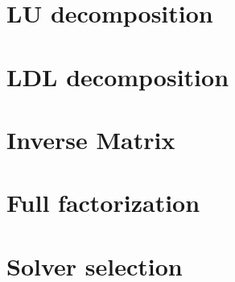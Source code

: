 \documentclass[fontsize = 10pt,DIV = 13]{scrartcl}
\begin{document}
\begin{comment}


\subsection{Notation}

This document uses bold symbols for matrices and vectors.
Bold capital letters like $\mathbf{A}$ are used for matrices.
Lower case bold letters are used for vectors ($\mathbf{r}$, $\mathbf{x}$).
The individual elements of a vector are given by:

\begin{align*}
\mathbf{x}
=
\begin{bmatrix}
x_0\\
x_1\\
\vdots\\
x_{N-1}
\end{bmatrix}
\end{align*}

Zero based indexing is used since this makes it easier to translate the equations into C++ code.


The individual components of the matrix $\mathbf{A}$ can be distinguished by a single column specific character and a zero based row index.
The column specific characters start with the character $a$ for the first column and increase alphabetically.
For example, the components of $\mathbf{A}$ with size $3 \times 3$ are:

\begin{align*}
\mathbf{A}
=
\begin{bmatrix}
a_0&b_0&c_0\\
a_1&b_1&c_1\\
a_2&b_2&c_2
\end{bmatrix}
\end{align*}

This element naming is chosen because it can be easier translated into vectorized code than the common double index notation.
\end{comment}






\section{LU decomposition}
\label{sec:LU}



\section{LDL decomposition}
\label{sec:LDL}

\section{Inverse Matrix}
\label{sec:InverseMatrix}

\section{Full factorization}
\label{sec:fullFactorization}




\section{Solver selection}
\label{sec:solverSelection}
\end{document}
